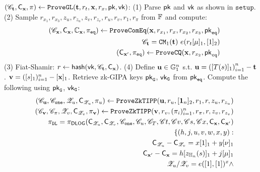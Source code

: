 \begin{footnotesize}
\begin{algorithm}[bt]
$({\mathscr{C}}_{{{\mathbf {t}}}}, {\mathsf{C}}_{{{\mathbf {x}}}}, \pi)
	\leftarrow {\texttt{ProveGL}}({{\mathbf {t}}}, r_t, {{\mathbf {x}}}, r_x, \mathsf{pk}, \mathsf{vk})$: \newline
(1) Parse $\mathsf{pk}$ and $\mathsf{vk}$ as shown in $\texttt{setup}$.  \newline
(2) Sample $r_{x_1}, r_{x_3}, z_u, r_{z_u}, z_v, r_{z_v}, r_u, r_v, r_1, 
r_{\pi}$ 
from $\mathbb{F}$ and compute: \newline
\begin{eqnarray*}
& &
	({\mathscr{C}}_{{{\mathbf {x}}}}, {\mathsf{C}}_{{{\mathbf {x}}}}, {\mathbb{C}}_{{{\mathbf {x}}}},
	\pi_{{\tt eq}})
	\leftarrow {\texttt{ProveComEq}}({{\mathbf {x}}}, r_{x_1}, r_{x}, r_{x_2}, r_{x_3}, 
		\mathsf{pk}_{{\tt eq}}) \\
& & {\mathscr{C}}_{{{\mathbf {t}}}} = {\mathtt{CM}}_1({{\mathbf {t}}}) ~e(r_t[\mu]_1, [1]_2) \\
& & ({\mathsf{C}}_{{{\mathbf {x}}}'}, \pi_{{\tt eq}}) \leftarrow {\texttt{ProveCQ}}({{\mathbf {x}}}, r_{x_2},\mathsf{pk}_{{\tt cq}}) 
\end{eqnarray*}
(3) Fiat-Shamir: $r \leftarrow \mathsf{hash}(\mathsf{vk}, {\mathscr{C}}_{{{\mathbf {t}}}}, {\mathsf{C}}_{{{\mathbf {x}}}})$. \newline
(4) Define ${{\mathbf {u}}} \in {\mathbb{G}}_1^n$ s.t.
	${{\mathbf {u}}} = \left([T(s)]_1\right)_{i=1}^n - {{\mathbf {t}}}$.
 	${{\mathbf {v}}} = ([s]_1)_{i=1}^n - [{{\mathbf {x}}}]_1$.  
	Retrieve zk-GIPA keys $\mathsf{pk}_{{\tt G}}$, 
	$\mathsf{vk}_{{\tt G}}$ from $\mathsf{pk}_{{\tt eq}}$.
Compute the following using $\mathsf{pk}_{{\tt G}}$, $\mathsf{vk}_{{\tt G}}$:
\begin{eqnarray*}
& &
(\GCommit_{\myvec{u}}, \GCommit_{\ttt{one}}, \Z_u, \Commit_{\Z_u},
	\prf_u) \leftarrow
	\zktippprove(\myvec{u}, r_u, [\myvec{1}_n]_2, r_1, r, z_u, r_{z_u})\\
& &
( \GCommit_{\myvec{v}}, \GCommit_{\myvec{\prf}}, \Z_v, \Commit_{\Z_v}, \prf_\myvec{v}) \leftarrow
	\zktippprove(\myvec{v}, r_v, (\prf_i)_{i=1}^n, r_{\pi}, r, z_v, r_{z_v})
	\\
& &
\prf_{\ttt{DL}} = \prfdlog(\Commit_{\Z_u}, \Commit_{\Z_v}, 
	\GCommit_{\tt{one}}, \GCommit_{u}, \GCommit_{T}, \GCommit{t},
	\GCommit{v}, \GCommit{s}, \GCommit{x}, \Commit_{\myvec{x}}, \Commit_{\myvec{x}'}) \\
& &\{(h,j,u,v,w,x,y): \\ 
& & \hspace*{0.1in}
	\Commit_{{\Z_u}} - \Commit_{{\Z_v}} =
		x[1]_1 + y[\nu]_1 \\
& & \hspace*{0.1in}
	\Commit_{\myvec{x}'} - \Commit_{\myvec{x}} =  h [z_\V(s)]_1 + j [\mu]_1 \\
& & \hspace*{0.1in}
	\Z_u/\Z_v = e([1], [1])^x \And  \\

\end{eqnarray*}
\end{algorithm}
\end{footnotesize}

